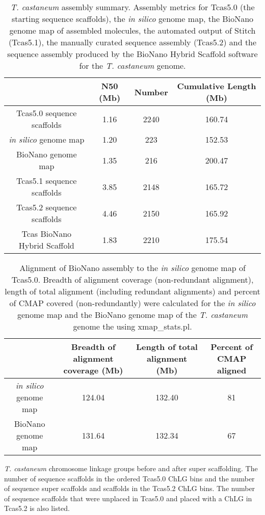 \documentclass{bmcart}
\begin{document}
\begin{backmatter}
\begin{table}[h!]
	\caption{\textit{T. castaneum} assembly summary. Assembly metrics for Tcas5.0 (the starting sequence scaffolds), the \textit{in silico} genome map, the BioNano genome map of assembled molecules, the automated output of Stitch (Tcas5.1), the manually curated sequence assembly (Tcas5.2) and the sequence assembly produced by the BioNano Hybrid Scaffold software for the \textit{T. castaneum} genome.}
	\begin{tabular}{cccc}
		\hline
		& N50 (Mb)  & Number & Cumulative Length (Mb)\\ \hline
		Tcas5.0 sequence scaffolds & 1.16 & 2240 & 160.74\\
		\textit{in silico} genome map & 1.20 &  223 & 152.53\\
		BioNano genome map & 1.35 &  216 & 200.47\\
		Tcas5.1 sequence scaffolds & 3.85 & 2148 & 165.72\\
		Tcas5.2 sequence scaffolds & 4.46 & 2150 & 165.92\\ 
		Tcas BioNano Hybrid Scaffold & 1.83 & 2210 &175.54 \\ \hline
	\end{tabular}
\end{table}
\begin{table}[h!]
\caption{Alignment of BioNano assembly to the \textit{in silico} genome map of Tcas5.0. Breadth of alignment coverage (non-redundant alignment), length of total alignment (including redundant alignments) and percent of CMAP covered (non-redundantly) were calculated for the \textit{in silico} genome map and the BioNano genome map of the \textit{T. castaneum} genome the using xmap\_stats.pl.}
      \begin{tabular}{cccc}
        \hline
           & Breadth of alignment coverage (Mb) & Length of total alignment (Mb) & Percent of CMAP aligned \\ \hline
        \textit{in silico} genome map & 124.04 & 132.40 & 81 \\
        BioNano genome map & 131.64 & 132.34 & 67 \\ \hline
      \end{tabular}
\end{table}
\begin{table}[h!]
	\caption{\textit{T. castaneum} chromosome linkage groups before and after super scaffolding. The number of sequence scaffolds in the ordered Tcas5.0 ChLG bins and the number of sequence super scaffolds and scaffolds in the Tcas5.2 ChLG bins. The number of sequence scaffolds that were unplaced in Tcas5.0 and placed with a ChLG in Tcas5.2 is also listed. }

\end{table}
\end{backmatter}
\end{document}

